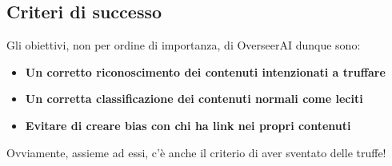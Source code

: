 \documentclass[a4paper,12pt]{report}
\begin{document}
\newpage
\subsection{Criteri di successo}
Gli obiettivi, non per ordine di importanza, di OverseerAI dunque sono:
\begin{itemize}
    \item \textbf{Un corretto riconoscimento dei contenuti intenzionati a truffare}
    \item \textbf{Un corretta classificazione dei contenuti normali come leciti}
    \item \textbf{Evitare di creare bias con chi ha link nei propri contenuti}
\end{itemize}
Ovviamente, assieme ad essi, c'è anche il criterio di aver sventato delle truffe!
\end{document}

